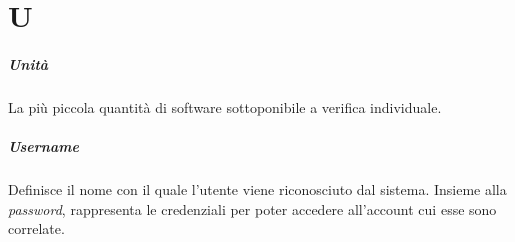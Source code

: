 \chapter{U}

\paragraph*{Unità}
La più piccola quantità di software sottoponibile a verifica individuale.

\paragraph*{Username}
Definisce il nome con il quale l'utente viene riconosciuto dal sistema. Insieme alla \textit{password}, rappresenta le credenziali per poter accedere all'account cui esse sono correlate.
